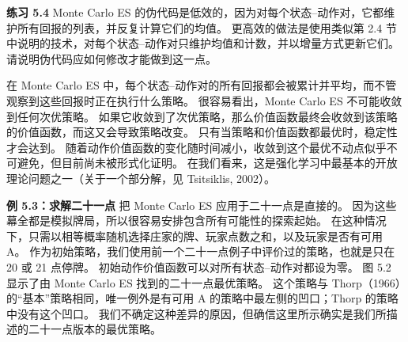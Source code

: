 \documentclass[UTF8, 12pt, fontset=fandol, oneside]{ctexart}
\begin{document}
\begin{center}
\end{center}

\noindent\textbf{练习 5.4}
Monte Carlo ES 的伪代码是低效的，因为对每个状态--动作对，它都维护所有回报的列表，并反复计算它们的均值。
更高效的做法是使用类似第 2.4 节中说明的技术，对每个状态--动作对只维护均值和计数，并以增量方式更新它们。
请说明伪代码应如何修改才能做到这一点。

在 Monte Carlo ES 中，每个状态--动作对的所有回报都会被累计并平均，而不管观察到这些回报时正在执行什么策略。
很容易看出，Monte Carlo ES 不可能收敛到任何次优策略。
如果它收敛到了次优策略，那么价值函数最终会收敛到该策略的价值函数，而这又会导致策略改变。
只有当策略和价值函数都最优时，稳定性才会达到。
随着动作价值函数的变化随时间减小，收敛到这个最优不动点似乎不可避免，但目前尚未被形式化证明。
在我们看来，这是强化学习中最基本的开放理论问题之一（关于一个部分解，见 Tsitsiklis, 2002）。

\noindent\textbf{例 5.3：求解二十一点}
把 Monte Carlo ES 应用于二十一点是直接的。
因为这些幕全都是模拟牌局，所以很容易安排包含所有可能性的探索起始。
在这种情况下，只需以相等概率随机选择庄家的牌、玩家点数之和，以及玩家是否有可用 A。
作为初始策略，我们使用前一个二十一点例子中评价过的策略，也就是只在 20 或 21 点停牌。
初始动作价值函数可以对所有状态--动作对都设为零。
图 5.2 显示了由 Monte Carlo ES 找到的二十一点最优策略。
这个策略与 Thorp（1966）的“基本”策略相同，唯一例外是有可用 A 的策略中最左侧的凹口；Thorp 的策略中没有这个凹口。
我们不确定这种差异的原因，但确信这里所示确实是我们所描述的二十一点版本的最优策略。
\end{document}
